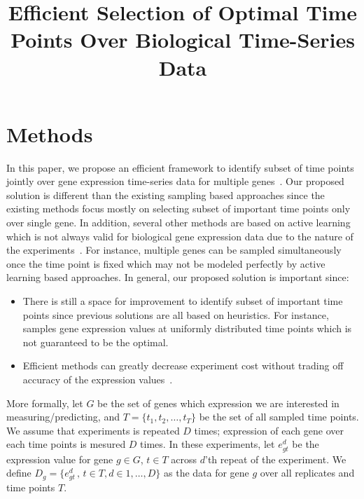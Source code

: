 \documentclass[10pt]{article}
\begin{document}
\title{Efficient Selection of Optimal Time Points Over Biological Time-Series Data}
\date{}

\maketitle

\section{Methods}

In this paper, we propose an efficient framework to identify subset of time points
jointly over gene expression time-series data for multiple genes~\cite{spellman1998}. Our
proposed solution is different than the existing sampling based approaches since
the existing methods focus mostly on selecting subset of important time
points only over single gene. In addition, several other methods are
based on active learning which is not always valid for biological gene
expression data due to the nature of the experiments~\cite{singh2005}. For instance, multiple genes can be sampled simultaneously
once the time point is fixed which may not be modeled perfectly by
active learning based approaches. In general, our proposed solution is important since:
%
\begin{itemize}
\item There is still a space for improvement to identify subset of
  important time points since previous solutions are all based on heuristics. For
  instance,~\cite{bar2012} samples gene expression values at uniformly
  distributed time points which is not guaranteed to be the optimal. 
\vspace{0.05cm}
\item Efficient methods can greatly decrease experiment cost without
  trading off accuracy of the expression values~\cite{lizotte2002}.
\end{itemize}
%
More formally, let $G$ be the set of genes which expression we are interested in
measuring/predicting, and $T = \{t_{1}, t_{2}, \ldots, t_{T}\}$ be the
set of all sampled time points. We assume that experiments is repeated
$D$ times; expression of each gene over each time points is mesured
$D$ times. In these experiments, let $e_{gt}^{d}$ be the expression value for gene $g \in G$, $t \in T$ across $d$'th repeat of
the experiment. We define $D_{g} = \{e_{gt}^{d}\,,\, t \in T, d \in 1,\ldots,D\}$ as the data for gene $g$ over all
replicates and time points $T$.
\end{document}
